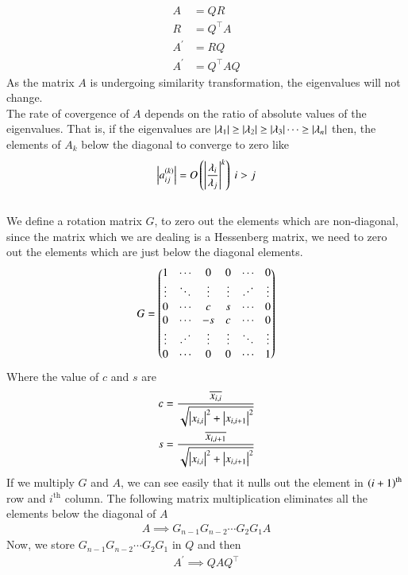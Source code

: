 \documentclass[journal]{IEEEtran}
\begin{document}
\begin{align}
	A &= QR\\
	R &= Q^\top A\\
	A^\prime &= RQ\\
	A^\prime &= Q^\top AQ
\end{align}
As the matrix $A$ is undergoing similarity transformation, the eigenvalues will not change.\\
The rate of covergence of $A$ depends on the ratio of absolute values of the eigenvalues. That is, if the eigenvalues are $\left\vert\lambda_1\right\vert \geq \left\vert\lambda_2\right\vert \geq \left\vert\lambda_3\right\vert \dots \geq \left\vert\lambda_n\right\vert$ then, the elements of $A_k$ below the diagonal to converge to zero like
\begin{align}
    \left\vert a_{ij}^{\left(k\right)}\right\vert = O\left(\left\vert\frac{\lambda_i}{\lambda_j}\right\vert^k\right)\text{    } i > j
\end{align}
\\
We define a rotation matrix $G$, to zero out the elements which are non-diagonal, since the matrix which we are dealing is a Hessenberg matrix, we need to zero out the elements which are just below the diagonal elements.
\begin{align}
G = \myvec{
1 & \cdots & 0 & 0 & \cdots & 0 \\
\vdots & \ddots & \vdots & \vdots & \reflectbox{$\ddots$} & \vdots \\
0 & \cdots & c & s & \cdots & 0\\
0 & \cdots & -s & c & \cdots & 0\\
\vdots & \reflectbox{$\ddots$} & \vdots & \vdots & \ddots & \vdots\\
0 & \cdots & 0 & 0 & \cdots & 1
}
\end{align}
Where the value of $c$ and $s$ are
\begin{align}
	c = \frac{\overline{x_{i,i}}}{\sqrt{\left\vert x_{i,i}\right\vert^2+\left\vert x_{i,i+1}\right\vert^2}}\\
	s = \frac{\overline{x_{i,i+1}}}{\sqrt{\left\vert x_{i,i}\right\vert^2+\left\vert x_{i,i+1}\right\vert^2}}
\end{align}
If we multiply $G$ and $A$, we can see easily that it nulls out the element in $\left(i+1\right)^{\text{th}}$ row and $i^\text{th}$ column. The following matrix multiplication eliminates all the elements below the diagonal of $A$
\begin{align}
	A \implies G_{n-1}G_{n-2}\cdots G_2G_1A
\end{align}
Now, we store $G_{n-1}G_{n-2}\cdots G_2G_1$ in $Q$ and then
\begin{align}
	A^\prime \implies QAQ^\top\\
\end{align}
\end{document}
